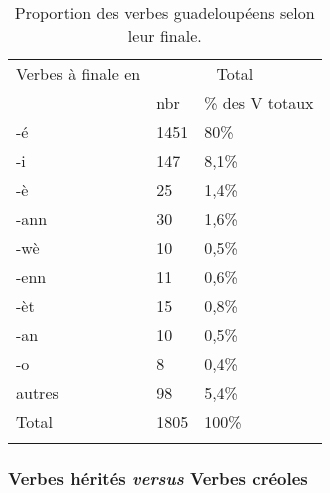 \documentclass[output=paper]{langsci/langscibook}
\begin{document}
\begin{table}
\begin{tabular}{lll}
\lsptoprule
Verbes à finale en & \multicolumn{2}{c}{Total}\\
& nbr & \% des V totaux \\
\midrule
-é & 1451 & 80\%\\
-i & 147 & 8,1\%\\
-è & 25 & 1,4\%\\
-ann & 30 & 1,6\%\\
-wè & 10 & 0,5\%\\
-enn & 11 & 0,6\%\\
-èt & 15 & 0,8\%\\
-an & 10 & 0,5\%\\
-o & 8 & 0,4\%\\
autres & 98 &
5,4\%\\
Total & 1805 & 100\%\\

\lspbottomrule
\end{tabular}
\caption{Proportion des verbes guadeloupéens selon leur finale.}
\label{tab:VilloingDeglas:2}
\end{table}



\subsubsection{\texorpdfstring{Verbes hérités \emph{versus} Verbes
créoles}{Verbes hérités versus Verbes créoles}}\label{verbes-hérités-versus-verbes-créoles}
\end{document}
